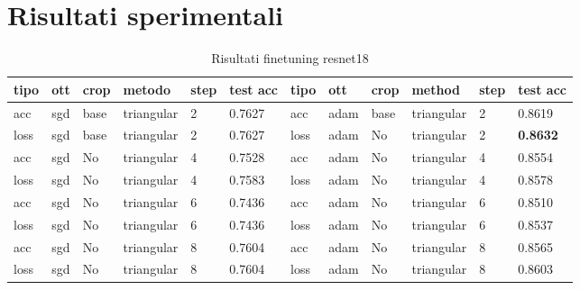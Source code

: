 \newpage
\appendix
\section{Risultati sperimentali}
\begin{table}[H]
\centering
\caption{Risultati finetuning resnet18}
\begin{adjustbox}{width=1\textwidth}
\begin{tabular}{|l|l|l|l|l|l||l|l|l|l|l|l|}
\hline
\textbf{tipo} & \textbf{ott} & \textbf{crop} & \textbf{metodo} & \textbf{step} & \textbf{test acc} & \textbf{tipo} & \textbf{ott} & \textbf{crop} & \textbf{method} & \textbf{step} & \textbf{test acc} \\ \hline
acc           & sgd          & base          & triangular      & 2             & 0.7627            & acc           & adam         & base          & triangular      & 2             & 0.8619   \\ \hline
loss          & sgd          & base          & triangular      & 2             & 0.7627            & loss          & adam         & No          & triangular      & 2             & \textbf{0.8632}            \\ \hline
acc           & sgd          & No          & triangular      & 4             & 0.7528            & acc           & adam         & No          & triangular      & 4             & 0.8554            \\ \hline
loss          & sgd          & No          & triangular      & 4             & 0.7583            & loss          & adam         & No          & triangular      & 4             & 0.8578            \\ \hline
acc           & sgd          & No          & triangular      & 6             & 0.7436            & acc           & adam         & No          & triangular      & 6             & 0.8510            \\ \hline
loss          & sgd          & No          & triangular      & 6             & 0.7436            & loss          & adam         & No          & triangular      & 6             & 0.8537            \\ \hline
acc           & sgd          & No          & triangular      & 8             & 0.7604            & acc           & adam         & No          & triangular      & 8             & 0.8565            \\ \hline
loss          & sgd          & No          & triangular      & 8             & 0.7604            & loss          & adam         & No          & triangular      & 8             & 0.8603            \\ \hline

\end{tabular}
\end{adjustbox}
\end{table}
